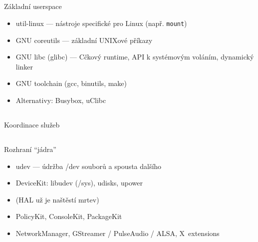 \documentclass{beamer}
\begin{document}
\subsection{}
\begin{frame}{Základní userspace}
\begin{itemize}
\item util-linux --- nástroje specifické pro Linux (např. {\tt mount})
\item GNU coreutils --- základní UNIXové příkazy
\item GNU libc (glibc) --- Cčkový runtime, API k systémovým voláním, dynamický linker
\item GNU toolchain (gcc, binutils, make)
\item Alternativy: Busybox, uClibc
\end{itemize}
\end{frame}

\subsection{}
\begin{frame}{Koordinace služeb}
\end{frame}

\subsection{}
\begin{frame}{Rozhraní ``jádra''}
\begin{itemize}
\item udev --- údržba /dev souborů a spousta dalšího
\item DeviceKit: libudev (/sys), udisks, upower
\item (HAL už je naštěstí mrtev)
\item PolicyKit, ConsoleKit, PackageKit
\item NetworkManager, GStreamer / PulseAudio / ALSA, X~extensions
\end{itemize}
\end{frame}
\end{document}

